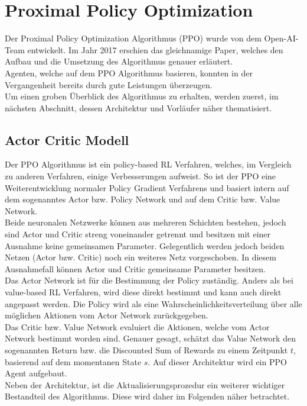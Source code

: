 \section{Proximal Policy Optimization} \label{sec:Grundlagen_PPO}
Der Proximal Policy Optimization Algorithmus (PPO) wurde von dem Open-AI-Team entwickelt. Im Jahr 2017 erschien das gleichnamige Paper, welches den Aufbau und die Umsetzung des Algorithmus genauer erläutert. \citep{PPO} \\
Agenten, welche auf dem PPO Algorithmus basieren, konnten in der Vergangenheit bereits durch gute Leistungen überzeugen.\\
Um einen groben Überblick des Algorithmus zu erhalten, werden zuerst, im nächsten Abschnitt, dessen Architektur und Vorläufer näher thematisiert.

\subsection{Actor Critic Modell} \label{subsec:Grundlagen_actor_critic}
Der PPO Algorithmus ist ein policy-based  RL Verfahren, welches, im Vergleich zu anderen Verfahren, einige Verbesserungen aufweist. So ist der PPO eine Weiterentwicklung normaler Policy Gradient Verfahrens und basiert intern auf dem sogenanntes Actor bzw. Policy Network und auf dem Critic bzw. Value Network. \citep[S. 273 f.]{Sutton1998}\\
Beide neuronalen Netzwerke können aus mehreren Schichten bestehen, jedoch sind Actor und Critic streng voneinander getrennt und besitzen mit einer Ausnahme keine gemeinsamen Parameter. Gelegentlich werden jedoch beiden Netzen (Actor bzw. Critic) noch ein weiteres Netz vorgeschoben. In diesem Ausnahmefall können Actor und Critic gemeinsame Parameter besitzen.\\
Das Actor Network ist für die Bestimmung der Policy zuständig. Anders als bei value-based  RL Verfahren, wird diese direkt bestimmt und kann auch direkt angepasst werden. Die Policy wird als eine Wahrscheinlichkeitsverteilung über alle möglichen Aktionen vom Actor Network zurückgegeben. \\
Das Critic bzw. Value Network evaluiert die Aktionen, welche vom Actor Network bestimmt worden sind. Genauer gesagt, schätzt das Value Network den sogenannten Return bzw. die Discounted Sum of Rewards  zu einem Zeitpunkt $t$, basierend auf dem momentanen State $s$. Auf dieser Architektur wird ein PPO Agent aufgebaut.\\
Neben der Architektur, ist die Aktualisierungsprozedur ein weiterer wichtiger Bestandteil des Algorithmus. Diese wird daher im Folgenden näher betrachtet.


